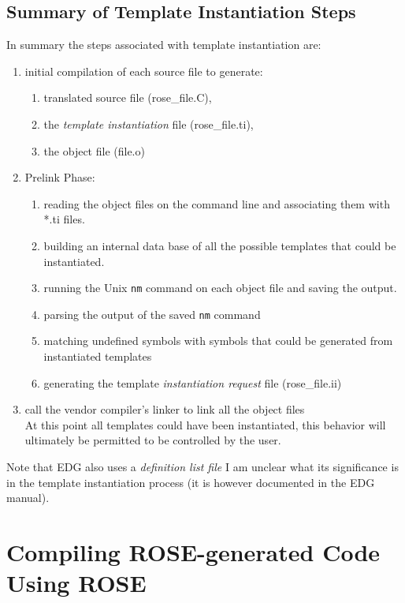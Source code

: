 {\subsection{Summary of Template Instantiation Steps}
   In summary the steps associated with template instantiation are:
\begin{enumerate}
   \item initial compilation of each source file to generate: 
   \begin{enumerate}
      \item translated source file (rose\_file.C),
      \item the {\em template instantiation} file (rose\_file.ti),
      \item the object file (file.o)
   \end{enumerate}
   \item Prelink Phase:
   \begin{enumerate}
      \item reading the object files on the command line and associating them with *.ti files.  
      \item building an internal data base of all the possible templates that could be instantiated.
      \item running the Unix {\tt nm} command on each object file and saving the output.
      \item parsing the output of the saved {\tt nm} command
      \item matching undefined symbols with symbols that could be generated from instantiated templates
      \item generating the template {\em instantiation request} file (rose\_file.ii)
   \end{enumerate}
   \item call the vendor compiler's linker to link all the object files \\
         At this point all templates could have been instantiated, this behavior will
         ultimately be permitted to be controlled by the user.
\end{enumerate}

Note that EDG also uses a {\em definition list file}  I am unclear what its significance
is in the template instantiation process (it is however documented in the EDG manual).
}


\section{Compiling ROSE-generated Code Using ROSE}

